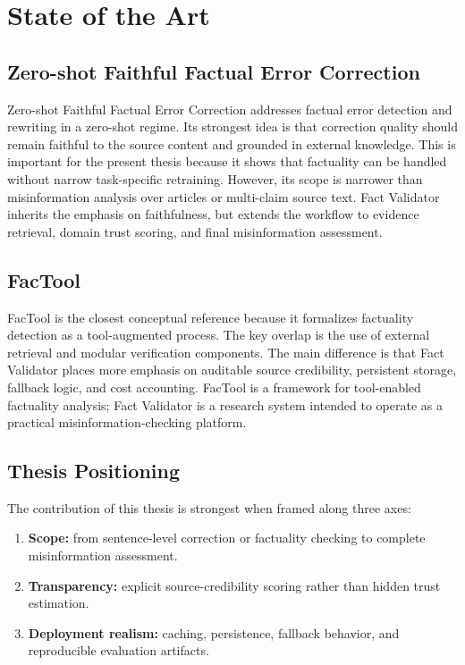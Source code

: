 \documentclass[12pt,a4paper,openright]{report}
\begin{document}
\chapter{State of the Art}

\section{Zero-shot Faithful Factual Error Correction}

Zero-shot Faithful Factual Error Correction addresses factual error detection and rewriting in a zero-shot regime. Its strongest idea is that correction quality should remain faithful to the source content and grounded in external knowledge. This is important for the present thesis because it shows that factuality can be handled without narrow task-specific retraining. However, its scope is narrower than misinformation analysis over articles or multi-claim source text. Fact Validator inherits the emphasis on faithfulness, but extends the workflow to evidence retrieval, domain trust scoring, and final misinformation assessment.

\section{FacTool}

FacTool is the closest conceptual reference because it formalizes factuality detection as a tool-augmented process. The key overlap is the use of external retrieval and modular verification components. The main difference is that Fact Validator places more emphasis on auditable source credibility, persistent storage, fallback logic, and cost accounting. FacTool is a framework for tool-enabled factuality analysis; Fact Validator is a research system intended to operate as a practical misinformation-checking platform.

\section{Thesis Positioning}

The contribution of this thesis is strongest when framed along three axes:

\begin{enumerate}
  \item \textbf{Scope:} from sentence-level correction or factuality checking to complete misinformation assessment.
  \item \textbf{Transparency:} explicit source-credibility scoring rather than hidden trust estimation.
  \item \textbf{Deployment realism:} caching, persistence, fallback behavior, and reproducible evaluation artifacts.
\end{enumerate}
\end{document}
